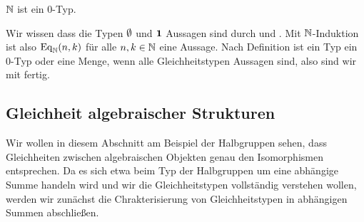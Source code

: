 \begin{bemerkung}
  $\mathbb{N}$ ist ein 0-Typ.
\end{bemerkung}
\begin{beweis}
  Wir wissen dass die Typen $\emptyset$ und $\mathbf{1}$ Aussagen sind durch  und .
  Mit $\mathbb{N}$-Induktion ist also $\mathrm{Eq}_{\mathbb{N}}(n,k)$ für alle $n,k\in\mathbb{N}$ eine Aussage.
  Nach Definition ist ein Typ ein 0-Typ oder eine Menge, wenn alle Gleichheitstypen Aussagen sind, also sind wir mit  fertig.
\end{beweis}

\subsection{Gleichheit algebraischer Strukturen}

Wir wollen in diesem Abschnitt am Beispiel der Halbgruppen sehen, dass Gleichheiten zwischen algebraischen Objekten genau den Isomorphismen entsprechen.
Da es sich etwa beim Typ der Halbgruppen um eine abhängige Summe handeln wird und wir die Gleichheitstypen vollständig verstehen wollen,
werden wir zunächst die Chrakterisierung von Gleichheitstypen in abhängigen Summen abschließen.

